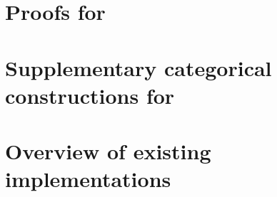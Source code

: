 \documentclass[11pt,a4paper]{report}
\begin{document}
\section{Proofs for }


\section{Supplementary categorical constructions for }


\section{Overview of existing implementations}




\cleardoublepage
{}
{}
\printbibliography
\end{document}
